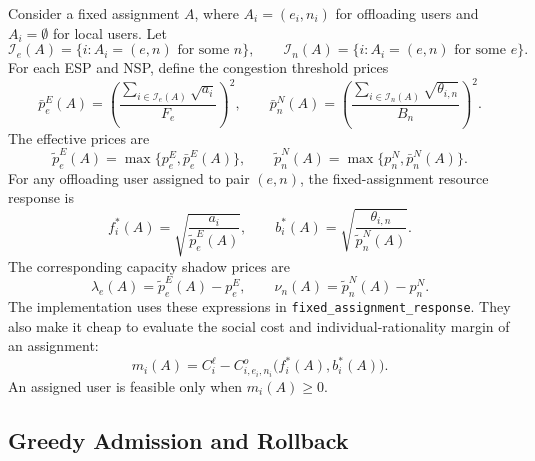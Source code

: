 \documentclass[11pt]{article}
\begin{document}
Consider a fixed assignment \(A\), where \(A_i=(e_i,n_i)\) for offloading users
and \(A_i=\emptyset\) for local users.  Let
\[
    \mathcal I_e(A)=\{i:A_i=(e,n)\text{ for some }n\},
    \qquad
    \mathcal I_n(A)=\{i:A_i=(e,n)\text{ for some }e\}.
\]
For each ESP and NSP, define the congestion threshold prices
\begin{equation}
    \bar p^E_e(A)
    =
    \left(
    \frac{\sum_{i\in\mathcal I_e(A)}\sqrt{a_i}}{F_e}
    \right)^2,
    \qquad
    \bar p^N_n(A)
    =
    \left(
    \frac{\sum_{i\in\mathcal I_n(A)}\sqrt{\theta_{i,n}}}{B_n}
    \right)^2 .
    \label{eq:multi-provider-bar-prices}
\end{equation}
The effective prices are
\begin{equation}
    \tilde p^E_e(A)=\max\{p^E_e,\bar p^E_e(A)\},
    \qquad
    \tilde p^N_n(A)=\max\{p^N_n,\bar p^N_n(A)\}.
    \label{eq:multi-provider-effective-prices}
\end{equation}
For any offloading user assigned to pair \((e,n)\), the fixed-assignment
resource response is
\begin{equation}
    f_i^*(A)=\sqrt{\frac{a_i}{\tilde p^E_e(A)}},
    \qquad
    b_i^*(A)=\sqrt{\frac{\theta_{i,n}}{\tilde p^N_n(A)}} .
    \label{eq:multi-provider-fixed-response}
\end{equation}
The corresponding capacity shadow prices are
\begin{equation}
    \lambda_e(A)=\tilde p^E_e(A)-p^E_e,
    \qquad
    \nu_n(A)=\tilde p^N_n(A)-p^N_n.
    \label{eq:multi-provider-shadow-prices}
\end{equation}
The implementation uses these expressions in
\texttt{fixed\_assignment\_response}.  They also make it cheap to evaluate the
social cost and individual-rationality margin of an assignment:
\begin{equation}
    m_i(A)=C_i^\ell-C^o_{i,e_i,n_i}\bigl(f_i^*(A),b_i^*(A)\bigr).
    \label{eq:multi-provider-margin}
\end{equation}
An assigned user is feasible only when \(m_i(A)\ge 0\).

\subsection{Greedy Admission and Rollback}
\end{document}
